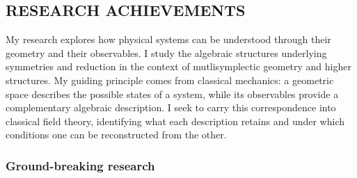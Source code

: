\documentclass[a4paper,fontsize=11bp]{scrartcl}
\newenvironment{refsection}{\begingroup}{\endgroup}
\begin{document}
\begin{refsection}





\subsection*{RESEARCH ACHIEVEMENTS}
\noindent
My research explores how physical systems can be understood through their geometry and their observables. 
I study the algebraic structures underlying symmetries and reduction in the context of mutlisymplectic geometry and higher structures. 
My guiding principle comes from classical mechanics: a geometric space describes the possible states of a system, while its observables provide a complementary algebraic description. 
I seek to carry this correspondence into classical field theory, identifying what each description retains and under which conditions one can be reconstructed from the other.


\subsubsection*{Ground-breaking research}
\begin{itemize}
\setlength{\itemsep}{0.15\baselineskip}
\setlength{\parsep}{0pt}


\end{itemize}
\end{refsection}
\end{document}
